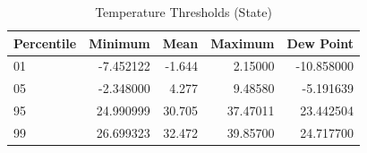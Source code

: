 \begin{table}
\centering
\caption{Temperature Thresholds (State)}
\centering
\begin{tabular}[t]{l|r|r|r|r}
\hline
Percentile & Minimum & Mean & Maximum & Dew Point\\
\hline
01 & -7.452122 & -1.644 & 2.15000 & -10.858000\\
\hline
05 & -2.348000 & 4.277 & 9.48580 & -5.191639\\
\hline
95 & 24.990999 & 30.705 & 37.47011 & 23.442504\\
\hline
99 & 26.699323 & 32.472 & 39.85700 & 24.717700\\
\hline
\end{tabular}
\end{table}
